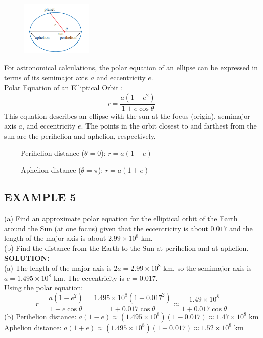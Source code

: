 \documentclass{article}
\begin{document}
\begin{figure}[htbp]
    \centering
    \includegraphics[width=0.3\textwidth]{graph65.png}
\end{figure}
For astronomical calculations, the polar equation of an ellipse can be expressed in terms of its semimajor axis $a$ and eccentricity $e$.\\
Polar Equation of an Elliptical Orbit :  \[
    r = \dfrac{a(1 - e^2)}{1 + e \cos\theta}
    \]
This equation describes an ellipse with the sun at the focus (origin), semimajor axis $a$, and eccentricity $e$.
The points in the orbit closest to and farthest from the sun are the perihelion and aphelion, respectively.

\begin{tcolorbox}[
    colback=white!,   %
    colframe=orange!80!white, %
    title=,   %
    boxrule=0.5mm,      %
    arc=3mm          %
    ]
    \begin{itemize}
        \item[-] Perihelion distance ($\theta = 0$): $r = a(1 - e)$
        \item[-] Aphelion distance ($\theta = \pi$): $r = a(1 + e)$
    \end{itemize}
\end{tcolorbox}


\subsection*{EXAMPLE 5}
(a) Find an approximate polar equation for the elliptical orbit of the Earth around the Sun (at one focus) given that the eccentricity is about $0.017$ and the length of the major axis is about $2.99 \times 10^8$ km.\\
(b) Find the distance from the Earth to the Sun at perihelion and at aphelion.\\
\textbf{SOLUTION:}\\
(a) The length of the major axis is $2a = 2.99 \times 10^8$ km, so the semimajor axis is $a = 1.495 \times 10^8$ km. The eccentricity is $e = 0.017$.\\
Using the polar equation:
\[
r = \dfrac{a(1 - e^2)}{1 + e \cos\theta} = \dfrac{1.495 \times 10^8 (1 - 0.017^2)}{1 + 0.017 \cos\theta} \approx \dfrac{1.49 \times 10^8}{1 + 0.017 \cos\theta}
\]
(b) Perihelion distance: $a(1 - e) \approx (1.495 \times 10^8)(1 - 0.017) \approx 1.47 \times 10^8$ km \\
 Aphelion distance: $a(1 + e) \approx (1.495 \times 10^8)(1 + 0.017) \approx 1.52 \times 10^8$ km
\end{document}
